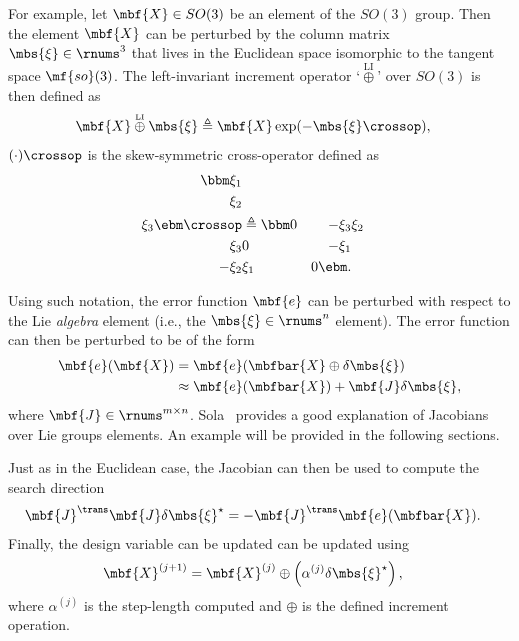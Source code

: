 \documentclass[ nobib, nofonts, notoc]{tufte-handout}
\newcommand{\liplus}{\overset{{\scriptscriptstyle\mathrm{LI}}}{\oplus}}
\begin{document}
    For example, let $\mbf{X}\in SO(3)$ be an element of the $SO(3)$ group. 
    Then the element $\mbf{X}$ can be perturbed by the column matrix $\mbs{\xi}\in\rnums^{3}$ that lives in the Euclidean space isomorphic to the tangent space $\mf{so}(3)$. 
    The left-invariant increment operator `$\liplus$' over $SO(3)$ is then defined as
    \begin{align}
        \mbf{X} \liplus \mbs{\xi} &\triangleq \mbf{X}\exp(-\mbs{\xi}\crossop),
    \end{align}    
     $(\cdot)\crossop$ is the skew-symmetric cross-operator defined as \cite{Barfoot_State_2017a}
    \begin{align}
        \bbm
            \xi_{1}\\
            \xi_{2}\\
            \xi_{3}
        \ebm\crossop
        &\triangleq
        \bbm
            0 & -\xi_{3} & \xi_{2} \\ 
            \xi_{3} & 0 & -\xi_{1}\\
            -\xi_{2} & \xi_{1} & 0
        \ebm.
    \end{align}

    Using such notation, the error function $\mbf{e}$ can be perturbed with respect to the Lie \emph{algebra} element (i.e., the $\mbs{\xi}\in\rnums^{n}$ element).
    The error function can then be perturbed to be of the form
    \begin{align}
        \mbf{e}(\mbf{X}) 
        &= \mbf{e}(\mbfbar{X}\oplus \delta\mbs{\xi})\\
        &\approx \mbf{e}(\mbfbar{X}) + \mbf{J}\delta\mbs{\xi},
    \end{align}
    where $\mbf{J}\in\rnums^{m\times n}$.
    Sola~\cite{Sola_micro_2019} provides a good explanation of Jacobians over Lie groups elements.
    An example will be provided in the following sections.

    Just as in the Euclidean case, the Jacobian can then be used to compute the search direction
    \begin{align}
        \mbf{J}^{\trans}\mbf{J}\delta\mbs{\xi}^{\star} &= -\mbf{J}^{\trans}\mbf{e}(\mbfbar{X}).
    \end{align}
    Finally, the design variable can be updated can be updated using
    \begin{align}
        \mbf{X}^{(j+1)} &= \mbf{X}^{(j)}\oplus \left( \alpha^{(j)}\delta\mbs{\xi}^{\star} \right),
    \end{align}
    where $\alpha^{(j)}$ is the step-length computed and $\oplus$ is the defined increment operation.
    
\end{document}
